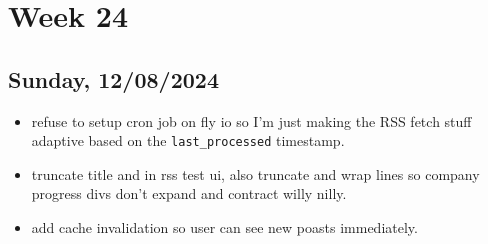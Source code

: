 \newpage
\section{Week 24}

\subsection{Sunday, 12/08/2024}
\begin{itemize}
    \item refuse to setup cron job on fly io so I'm just making the RSS fetch
        stuff adaptive based on the \texttt{last_processed} timestamp.
    \item truncate title and in rss test ui, also truncate and wrap lines so
        company progress divs don't expand and contract willy nilly.
    \item add cache invalidation so user can see new poasts immediately.
\end{itemize}
